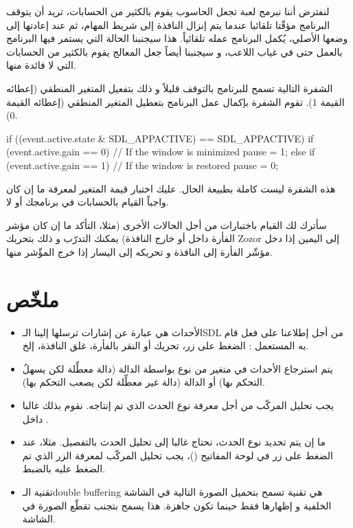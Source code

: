 لنفترض أننا نبرمج لعبة تجعل الحاسوب يقوم بالكثير من الحسابات، تريد أن يتوقف البرنامج مؤقّتا تلقائيا عندما يتم إنزال النافذة إلى شريط المهام، ثم عند إعادتها إلى وضعها الأصلي، يُكمل البرنامج عمله تلقائياً. هذا سيجنبنا الحالة التي يستمر فيها البرنامج بالعمل حتى في غياب اللاعب، و سيجنبنا أيضاً جعل المعالج يقوم بالكثير من الحسابات التي لا فائدة منها.

الشفرة التالية تسمح للبرنامج بالتوقف قليلاً و ذلك بتفعيل المتغير المنطقي 
(إعطائه القيمة 1). تقوم الشفرة بإكمال عمل البرنامج بتعطيل المتغير المنطقي (إعطائه القيمة 0).

\begin{Csource}
if ((event.active.state & SDL_APPACTIVE) == SDL_APPACTIVE)
{
	if (event.active.gain == 0) // If the window is minimized
		pause = 1;
	else if (event.active.gain == 1) // If the window is restored
		pause = 0;
}
\end{Csource}

\begin{information}
هذه الشفرة ليست كاملة بطبيعة الحال. عليك اختبار قيمة المتغير
لمعرفة ما إن كان واجباً القيام بالحسابات في برنامجك أو لا.
\end{information}

سأترك لك القيام باختبارات من أجل الحالات الأخرى (مثلا، التأكد ما إن كان مؤشر الفأرة داخل أو خارج النافذة) يمكنك التدرّب و ذلك بتحريك
\textenglish{Zozor}
إلى اليمين إذا دخل مؤشّر الفأرة إلى النافذة و تحريكه إلى اليسار إذا خرج المؤّشر منها.

\section*{ملخّص}

\begin{itemize}
	\item الأحداث هي عبارة عن إشارات ترسلها إلينا الـ\textenglish{SDL}
	من أجل إطلاعنا على فعل قام به المستعمل : الضغط على زر، تحريك أو النقر بالفأرة، غلق النافذة، إلخ.
	\item يتم استرجاع الأحداث في متغير من نوع
	بواسطة الدالة
	(دالة معطِّلة لكن يسهلُ التحكم بها) أو الدالة 
	(دالة غير معطِّلة لكن يصعب التحكم بها).
	\item يجب تحليل المركّب
	من أجل معرفة نوع الحدث الذي تم إنتاجه. نقوم بذلك غالبا داخل 
	.
	\item ما إن يتم تحديد نوع الحدث، نحتاج غالبا إلى تحليل الحدث بالتفصيل. مثلا، عند الضغط على زر في لوحة المفاتيح
	()،
	يجب تحليل المركّب
	لمعرفة الزر الذي تم الضغط عليه بالضبط.
	\item تقنية الـ\textenglish{double buffering}
	هي تقنية تسمح بتحميل الصورة التالية في الشاشة الخلفية و إظهارها فقط حينما تكون جاهزة. هذا يسمح بتجنب تقطّع الصورة في الشاشة.
\end{itemize}
